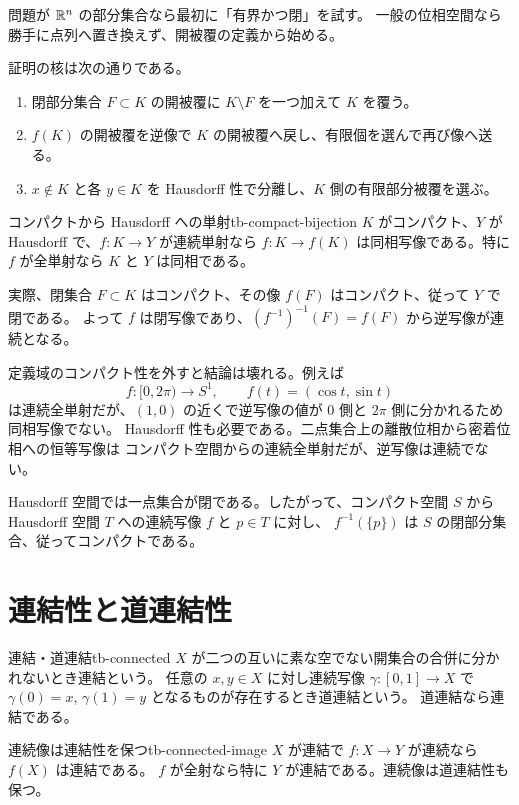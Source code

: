 問題が $\mathbb{R}^n$ の部分集合なら最初に「有界かつ閉」を試す。
一般の位相空間なら勝手に点列へ置き換えず、開被覆の定義から始める。

証明の核は次の通りである。
\begin{enumerate}
  \item 閉部分集合 $F\subset K$ の開被覆に $K\setminus F$ を一つ加えて $K$ を覆う。
  \item $f(K)$ の開被覆を逆像で $K$ の開被覆へ戻し、有限個を選んで再び像へ送る。
  \item $x\notin K$ と各 $y\in K$ を Hausdorff 性で分離し、$K$ 側の有限部分被覆を選ぶ。
\end{enumerate}

\begin{corollary}{コンパクトから Hausdorff への単射}{tb-compact-bijection}
$K$ がコンパクト、$Y$ が Hausdorff で、$f:K\to Y$ が連続単射なら
$f:K\to f(K)$ は同相写像である。特に $f$ が全単射なら $K$ と $Y$ は同相である。
\end{corollary}

実際、閉集合 $F\subset K$ はコンパクト、その像 $f(F)$ はコンパクト、従って $Y$ で閉である。
よって $f$ は閉写像であり、$(f^{-1})^{-1}(F)=f(F)$ から逆写像が連続となる。

定義域のコンパクト性を外すと結論は壊れる。例えば
\[
f:[0,2\pi)\to S^1,\qquad f(t)=(\cos t,\sin t)
\]
は連続全単射だが、$(1,0)$ の近くで逆写像の値が $0$ 側と $2\pi$ 側に分かれるため同相写像でない。
Hausdorff 性も必要である。二点集合上の離散位相から密着位相への恒等写像は
コンパクト空間からの連続全単射だが、逆写像は連続でない。

Hausdorff 空間では一点集合が閉である。したがって、コンパクト空間 $S$ から
Hausdorff 空間 $T$ への連続写像 $f$ と $p\in T$ に対し、
$f^{-1}(\{p\})$ は $S$ の閉部分集合、従ってコンパクトである。

\section{連結性と道連結性}

\begin{definition}{連結・道連結}{tb-connected}
$X$ が二つの互いに素な空でない開集合の合併に分かれないとき連結という。
任意の $x,y\in X$ に対し連続写像 $\gamma:[0,1]\to X$ で
$\gamma(0)=x$, $\gamma(1)=y$ となるものが存在するとき道連結という。
道連結なら連結である。
\end{definition}

\begin{theorem}{連続像は連結性を保つ}{tb-connected-image}
$X$ が連結で $f:X\to Y$ が連続なら $f(X)$ は連結である。
$f$ が全射なら特に $Y$ が連結である。連続像は道連結性も保つ。
\end{theorem}

